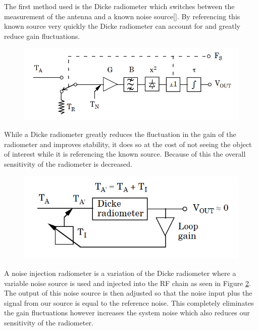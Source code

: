 The first method used is the Dicke radiometer which switches between the measurement of the antenna and a known noise source[\cite{Dicke}].  By referencing this known source very quickly the Dicke radiometer can account for and greatly reduce gain fluctuations.  

{\begin{figure}[h!tb] 
\centering
\includegraphics[width=\textwidth]{Images/Dicke_block.png}
\label{dicke_radiometer}
\end{figure}
}

While a Dicke radiometer greatly reduces the fluctuation in the gain of the radiometer and improves stability, it does so at the cost of not seeing the object of interest while it is referencing the known source.  Because of this the overall sensitivity of the radiometer is decreased.

{\begin{figure}[h!tb] 
\centering
\includegraphics[width=\textwidth]{Images/NoiseInj_block.png}
\label{NoiseInj_radiometer}
\end{figure}
}

A noise injection radiometer is a variation of the Dicke radiometer where a variable noise source is used and injected into the RF chain as seen in Figure \ref{NoiseInj_radiometer}.  The output of this noise source is then adjusted so that the noise input plus the signal from our source is equal to the reference noise.  This completely eliminates the gain fluctuations however increases the system noise which also reduces our sensitivity of the radiometer.

